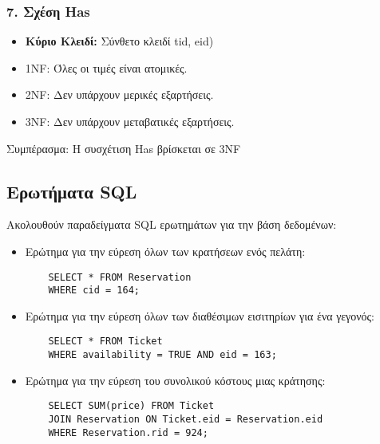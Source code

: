 \documentclass{article}
\begin{document}
\subsubsection*{7. Σχέση Has}
\begin{itemize}
    \item \textbf{Κύριο Κλειδί:} Σύνθετο κλειδί tid, eid)
    \item 1NF: Όλες οι τιμές είναι ατομικές.
    \item 2NF: Δεν υπάρχουν μερικές εξαρτήσεις.
    \item 3NF: Δεν υπάρχουν μεταβατικές εξαρτήσεις.
\end{itemize}
Συμπέρασμα: Η συσχέτιση Has βρίσκεται σε 3NF
\subsection*{Ερωτήματα SQL}
Ακολουθούν παραδείγματα SQL ερωτημάτων για την βάση δεδομένων:
\begin{itemize}
    \item Ερώτημα για την εύρεση όλων των κρατήσεων ενός πελάτη:
    \begin{lstlisting}
    SELECT * FROM Reservation
    WHERE cid = 164; 
    \end{lstlisting}
    \item Ερώτημα για την εύρεση όλων των διαθέσιμων εισιτηρίων για ένα γεγονός:
    \begin{lstlisting}
    SELECT * FROM Ticket
    WHERE availability = TRUE AND eid = 163;
    \end{lstlisting}
    \item Ερώτημα για την εύρεση του συνολικού κόστους μιας κράτησης:
    \begin{lstlisting}
    SELECT SUM(price) FROM Ticket
    JOIN Reservation ON Ticket.eid = Reservation.eid
    WHERE Reservation.rid = 924;
    \end{lstlisting}
\end{itemize}
\end{document}
